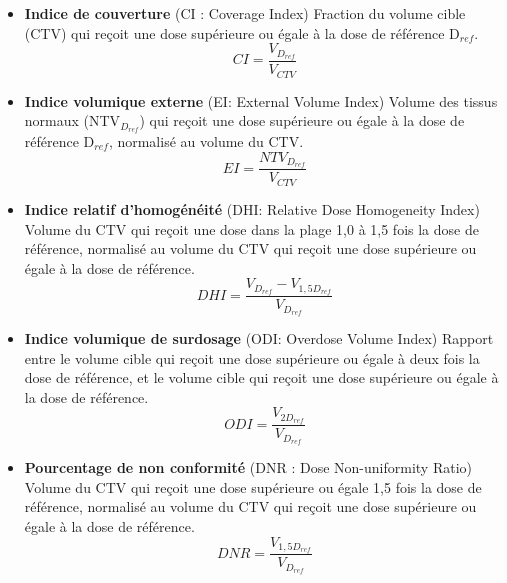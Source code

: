 \begin{itemize}[leftmargin=0pt, label=\textbullet, font=\LARGE]
\item[] \textbf{Indice de couverture} (CI : Coverage Index) \newline
Fraction du volume cible (CTV)  qui reçoit une dose supérieure ou égale à la dose de référence D$_{ref}$.
%
\begin{equation}\label{eqn:CI}
CI=\frac{V_{D_{ref}}}{V_{CTV}}
\end{equation}
%
\item[] \textbf{Indice volumique externe} (EI:  External Volume Index) \newline
Volume des tissus normaux (NTV$_{D_{ref}}$) qui reçoit une dose supérieure ou égale à la dose de référence D$_{ref}$, normalisé au volume du CTV.
%
\begin{equation}\label{eqn:EI}
EI=\frac{NTV_{D_{ref}}}{V_{CTV}}
\end{equation}
%
\item[] \textbf{Indice relatif d’homogénéité} (DHI: Relative Dose Homogeneity Index) \newline 
Volume du CTV qui reçoit une dose dans la plage 1,0 à 1,5 fois la dose de référence, normalisé au volume du CTV qui reçoit une dose supérieure ou égale à la dose de référence.
%
\begin{equation}\label{eqn:DHI}
DHI=\frac{V_{D_{ref}}-V_{1,5D_{ref}}}{V_{D_{ref}}}
\end{equation}
%
\item[] \textbf{Indice volumique de surdosage} (ODI: Overdose Volume Index) \newline
Rapport entre le volume cible qui reçoit une dose supérieure ou égale à deux fois la dose de référence, et le volume cible qui reçoit une dose supérieure ou égale à la dose de référence.
%
\begin{equation}\label{eqn:ODI}
ODI=\frac{V_{2D_{ref}}}{V_{D_{ref}}}
\end{equation}
%
\item[] \textbf{Pourcentage de non conformité} (DNR : Dose Non-uniformity Ratio) \newline
Volume du CTV qui reçoit une dose supérieure ou égale 1,5 fois la dose de référence, normalisé au volume du CTV qui reçoit une dose supérieure ou égale à la dose de référence.
%
\begin{equation}\label{eqn:DNR}
DNR=\frac{V_{1,5D_{ref}}}{V_{D_{ref}}}
\end{equation}
%
\end{itemize}
